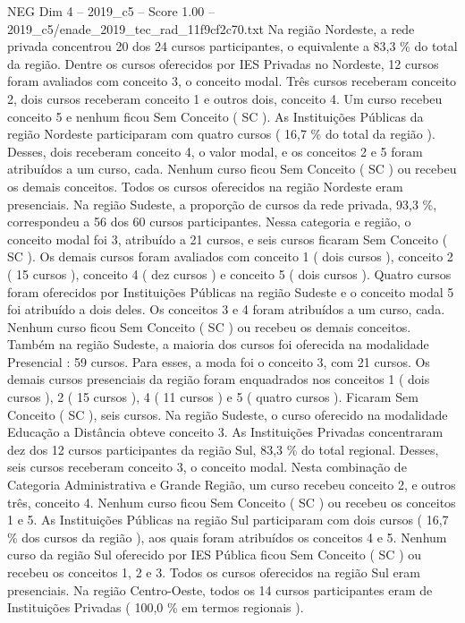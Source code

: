 \begin{textsample}{NEG Dim 4 – 2019\_c5 – Score 1.00 – 2019\_c5/enade\_2019\_tec\_rad\_11f9cf2c70.txt}
Na região Nordeste, a rede privada concentrou 20 dos 24 cursos participantes, o equivalente a 83,3 \% do total da região.
Dentre os cursos oferecidos por IES Privadas no Nordeste, 12 cursos foram avaliados com conceito 3, o conceito modal.
Três cursos receberam conceito 2, dois cursos receberam conceito 1 e outros dois, conceito 4.
Um curso recebeu conceito 5 e nenhum ficou Sem Conceito ( SC ).
As Instituições Públicas da região Nordeste participaram com quatro cursos ( 16,7 \% do total da região ).
Desses, dois receberam conceito 4, o valor modal, e os conceitos 2 e 5 foram atribuídos a um curso, cada.
Nenhum curso ficou Sem Conceito ( SC ) ou recebeu os demais conceitos.
Todos os cursos oferecidos na região Nordeste eram presenciais.
Na região Sudeste, a proporção de cursos da rede privada, 93,3 \%, correspondeu a 56 dos 60 cursos participantes.
Nessa categoria e região, o conceito modal foi 3, atribuído a 21 cursos, e seis cursos ficaram Sem Conceito ( SC ).
Os demais cursos foram avaliados com conceito 1 ( dois cursos ), conceito 2 ( 15 cursos ), conceito 4 ( dez cursos ) e conceito 5 ( dois cursos ).
Quatro cursos foram oferecidos por Instituições Públicas na região Sudeste e o conceito modal 5 foi atribuído a dois deles.
Os conceitos 3 e 4 foram atribuídos a um curso, cada.
Nenhum curso ficou Sem Conceito ( SC ) ou recebeu os demais conceitos.
Também na região Sudeste, a maioria dos cursos foi oferecida na modalidade Presencial : 59 cursos.
Para esses, a moda foi o conceito 3, com 21 cursos.
Os demais cursos presenciais da região foram enquadrados nos conceitos 1 ( dois cursos ), 2 ( 15 cursos ), 4 ( 11 cursos ) e 5 ( quatro cursos ).
Ficaram Sem Conceito ( SC ), seis cursos.
Na região Sudeste, o curso oferecido na modalidade Educação a Distância obteve conceito 3.
As Instituições Privadas concentraram dez dos 12 cursos participantes da região Sul, 83,3 \% do total regional.
Desses, seis cursos receberam conceito 3, o conceito modal.
Nesta combinação de Categoria Administrativa e Grande Região, um curso recebeu conceito 2, e outros três, conceito 4.
Nenhum curso ficou Sem Conceito ( SC ) ou recebeu os conceitos 1 e 5.
As Instituições Públicas na região Sul participaram com dois cursos ( 16,7 \% dos cursos da região ), aos quais foram atribuídos os conceitos 4 e 5.
Nenhum curso da região Sul oferecido por IES Pública ficou Sem Conceito ( SC ) ou recebeu os conceitos 1, 2 e 3.
Todos os cursos oferecidos na região Sul eram presenciais.
Na região Centro-Oeste, todos os 14 cursos participantes eram de Instituições Privadas ( 100,0 \% em termos regionais ).

\end{textsample}

